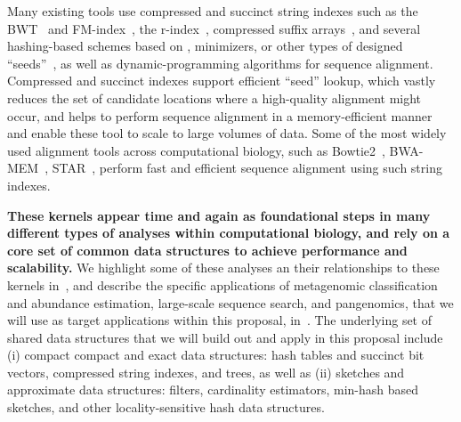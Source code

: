 \begin{itemize}
Many existing tools use compressed and succinct string indexes such as the BWT~\cite{burrows1994block} and FM-index~\cite{ferragina2000opportunistic}, the r-index~\cite{gagie2018optimal}, compressed suffix arrays~\cite{grossi2000compressed}, and several hashing-based schemes based on \kmers, minimizers, or other types of designed ``seeds''~\cite{li2018minimap2,pibiri2022sparse,sahlin2022strobealign}, as well as dynamic-programming algorithms for sequence alignment.
Compressed and succinct indexes support efficient ``seed'' lookup, which vastly reduces the set of candidate locations where a high-quality alignment might occur, and helps to perform sequence alignment in a memory-efficient manner and enable these tool to scale to large volumes of data.
Some of the most widely used alignment tools across computational biology, such as Bowtie2~\cite{langmead2012fast}, BWA-MEM~\cite{li2013aligning}, STAR~\cite{Dobin2012}, perform fast and efficient sequence alignment using such string indexes.
\end{itemize}

\noindent
\textbf{These kernels appear time and again as foundational steps in many different types of analyses within computational biology, and rely on a core set of common data structures to achieve performance and scalability.}  We highlight some of these analyses an their relationships to these kernels in~, and describe the specific applications of metagenomic classification and abundance estimation, large-scale sequence search, and pangenomics, that we will use as target applications within this proposal, in~. The underlying set of shared data structures that we will build out and apply in this proposal include (i) compact compact and exact data structures: hash tables and succinct bit vectors, compressed string indexes, and trees, as well as (ii) sketches and approximate data structures: filters, cardinality estimators,  min-hash based sketches, and other locality-sensitive hash data structures.

